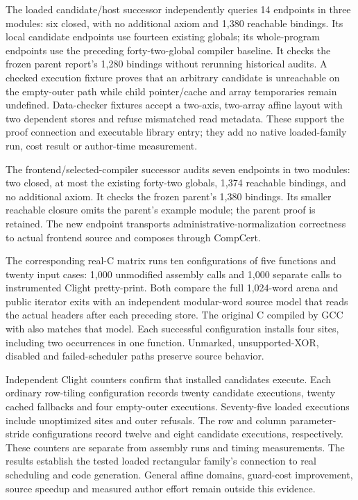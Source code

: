The loaded candidate/host successor independently queries 14 endpoints in
three modules: six closed, with no additional axiom and 1,380 reachable
bindings. Its local candidate endpoints use fourteen existing globals; its
whole-program endpoints use the preceding forty-two-global compiler baseline.
It checks the frozen parent report's 1,280 bindings without rerunning historical
audits. A checked execution fixture proves that an arbitrary candidate is
unreachable on the empty-outer path while child pointer/cache and array
temporaries remain undefined. Data-checker fixtures accept a two-axis,
two-array affine layout with two dependent stores and refuse mismatched read
metadata. These support the proof connection and executable library entry;
they add no native loaded-family run, cost result or author-time measurement.

The frontend/selected-compiler successor audits seven endpoints in two modules:
two closed, at most the existing forty-two globals, 1,374 reachable bindings,
and no additional axiom. It checks the frozen parent's 1,380 bindings. Its
smaller reachable closure omits the parent's example module; the parent proof
is retained. The new endpoint transports administrative-normalization
correctness to actual frontend source and composes through CompCert.

The corresponding real-C matrix runs ten configurations of five functions and
twenty input cases: 1,000 unmodified assembly calls and 1,000 separate calls to
instrumented Clight pretty-print. Both compare the full 1,024-word arena and
public iterator exits with an independent modular-word source model that reads
the actual headers after each preceding store. The original C compiled by GCC
with  also matches that model. Each successful configuration
installs four sites, including two occurrences in one function. Unmarked,
unsupported-XOR, disabled and failed-scheduler paths preserve source behavior.

Independent Clight counters confirm that installed candidates execute.
Each ordinary row-tiling configuration records twenty candidate executions,
twenty cached fallbacks and four empty-outer executions. Seventy-five loaded
executions include unoptimized sites and outer refusals. The row and column
parameter-stride configurations record twelve and eight candidate executions,
respectively. These counters are separate from assembly runs and timing
measurements. The results establish the tested loaded rectangular family's
connection to real scheduling and code generation. General affine domains,
guard-cost improvement, source speedup and measured author effort remain
outside this evidence.

